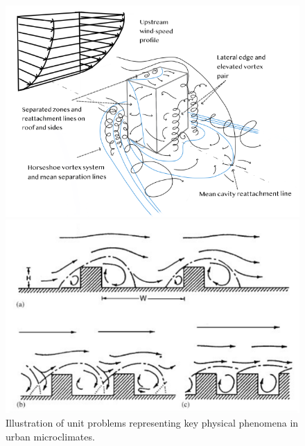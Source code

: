 \begin{figure}[h!]
    \centering
    \begin{minipage}{0.44\textwidth}
        \centering
        \includegraphics[width=\textwidth]{imgs/unit_problem_2.png}
    \end{minipage}
    \hfill
    \begin{minipage}{0.44\textwidth}
        \centering
        \includegraphics[width=\textwidth]{imgs/unit_problem_1.png}
    \end{minipage}
    \caption{Illustration of unit problems representing key physical phenomena in urban microclimates.}
\end{figure}
